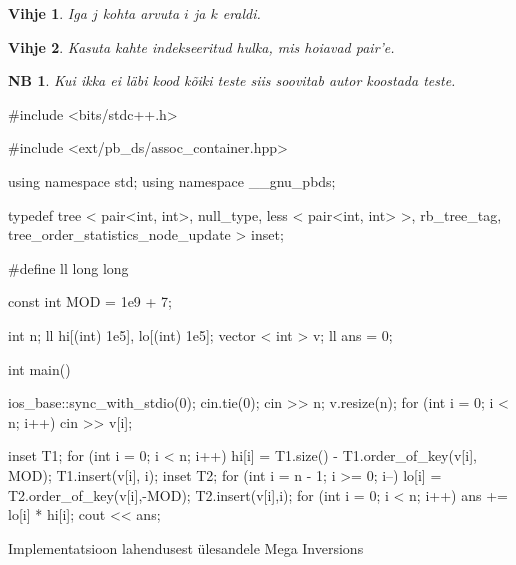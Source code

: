 \documentclass{trkut}
\newtheorem*{extra}{NB}
\newtheorem*{vihje}{Vihje}
\begin{document}
\begin{vihje}
Iga $j$ kohta arvuta $i$ ja $k$ eraldi.
\end{vihje}
\begin{vihje}
Kasuta kahte indekseeritud hulka, mis hoiavad pair'e.
\end{vihje}
\begin{extra}
Kui ikka ei läbi kood kõiki teste siis soovitab autor koostada teste.
\end{extra}

\begin{cclol}
#include <bits/stdc++.h>

#include <ext/pb_ds/assoc_container.hpp>

using namespace std;
using namespace __gnu_pbds;

typedef tree < pair<int, int>, null_type, less < pair<int, int> >, 
rb_tree_tag, tree_order_statistics_node_update > inset;

#define ll long long

const int MOD = 1e9 + 7;

int n;
ll hi[(int) 1e5], lo[(int) 1e5];
vector < int > v;
ll ans = 0;

int main() {
  ios_base::sync_with_stdio(0);
  cin.tie(0);
  cin >> n;
  v.resize(n);
  for (int i = 0; i < n; i++) cin >> v[i];

  inset T1;
  for (int i = 0; i < n; i++) {
    hi[i] = T1.size() - T1.order_of_key({v[i], MOD});
    T1.insert({v[i], i});
  }
  inset T2;
  for (int i = n - 1; i >= 0; i--) {
    lo[i] = T2.order_of_key({v[i],-MOD});
    T2.insert({v[i],i});
  }
  for (int i = 0; i < n; i++) ans += lo[i] * hi[i];
  cout << ans;
}
\end{cclol}
\begin{kk}[H]%
    \caption{Implementatsioon lahendusest ülesandele Mega Inversions}%
    \label{EMaxx}%
    \end{kk}
\end{document}
